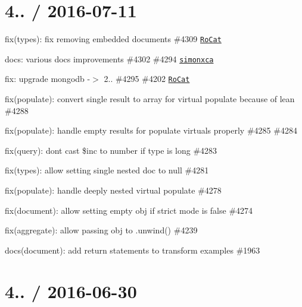 \section*{4.. / 2016-\/07-\/11 }


\begin{DoxyItemize}
\item fix(types)\+: fix removing embedded documents \#4309 \href{https://github.com/RoCat}{\tt Ro\+Cat}
\item docs\+: various docs improvements \#4302 \#4294 \href{https://github.com/simonxca}{\tt simonxca}
\item fix\+: upgrade mongodb -\/$>$ 2.. \#4295 \#4202 \href{https://github.com/RoCat}{\tt Ro\+Cat}
\item fix(populate)\+: convert single result to array for virtual populate because of lean \#4288
\item fix(populate)\+: handle empty results for populate virtuals properly \#4285 \#4284
\item fix(query)\+: dont cast \$inc to number if type is long \#4283
\item fix(types)\+: allow setting single nested doc to null \#4281
\item fix(populate)\+: handle deeply nested virtual populate \#4278
\item fix(document)\+: allow setting empty obj if strict mode is false \#4274
\item fix(aggregate)\+: allow passing obj to .unwind() \#4239
\item docs(document)\+: add return statements to transform examples \#1963
\end{DoxyItemize}

\section*{4.. / 2016-\/06-\/30 }


